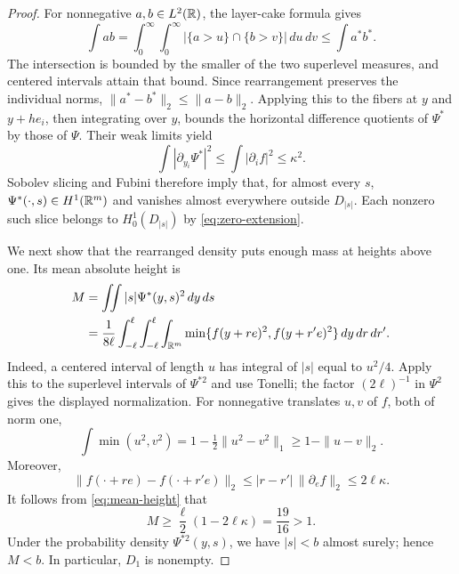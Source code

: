 \begin{proof}
For nonnegative $a,b\in L^2(\mathbb R)$, the layer-cake formula gives
\[
 \int ab
 =\int_0^\infty\!\int_0^\infty
       |\{a>u\}\cap\{b>v\}|\,du\,dv
 \le\int a^*b^*.
\]
The intersection is bounded by the smaller of the two superlevel measures,
and centered intervals attain that bound. Since rearrangement preserves
the individual norms, $\|a^*-b^*\|_2\le\|a-b\|_2$. Applying this to the
fibers at $y$ and $y+he_i$, then integrating over $y$, bounds the horizontal
difference quotients of $\Psi^*$ by those of $\Psi$. Their weak limits yield
\begin{equation}\label{eq:rearranged-energy}
 \int|\partial_{y_i}\Psi^*|^2\le\int|\partial_i f|^2\le\kappa^2.
\end{equation}
Sobolev slicing and Fubini therefore imply that, for almost every $s$,
$\Psi^*(\cdot,s)\in H^1(\mathbb R^m)$ and vanishes almost everywhere outside
$D_{|s|}$. Each nonzero such slice belongs to $H_0^1(D_{|s|})$ by
\eqref{eq:zero-extension}.

We next show that the rearranged density puts enough mass at heights above
one. Its mean absolute height is
\begin{equation}\label{eq:mean-height}
 \begin{split}
 M&=\iint |s|\Psi^*(y,s)^2\,dy\,ds\\
 &=\frac1{8\ell}\int_{-\ell}^{\ell}\int_{-\ell}^{\ell}
      \int_{\mathbb R^m}\min\{f(y+re)^2,f(y+r'e)^2\}\,dy\,dr\,dr'.
 \end{split}
\end{equation}
Indeed, a centered interval of length $u$ has integral of $|s|$ equal to
$u^2/4$. Apply this to the superlevel intervals of $\Psi^{*2}$ and use Tonelli;
the factor $(2\ell)^{-1}$ in $\Psi^2$ gives the displayed normalization.
For nonnegative translates $u,v$ of $f$, both of norm one,
\[
 \int\min(u^2,v^2)
 =1-\tfrac12\|u^2-v^2\|_1
 \ge1-\|u-v\|_2.
\]
Moreover,
\[
 \|f(\cdot+re)-f(\cdot+r'e)\|_2
 \le |r-r'|\,\|\partial_e f\|_2\le2\ell\kappa.
\]
It follows from \eqref{eq:mean-height} that
\begin{equation}\label{eq:height-lower}
 M\ge\frac\ell2(1-2\ell\kappa)=\frac{19}{16}>1.
\end{equation}
Under the probability density $\Psi^{*2}(y,s)$, we have $|s|<b$ almost surely;
hence $M<b$. In particular, $D_1$ is nonempty.


\end{proof}
